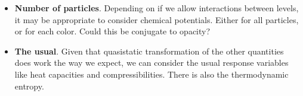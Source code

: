 \documentclass[../notebook.tex]{subfiles}
\begin{document}
\begin{itemize}
  \item \textbf{Number of particles}. Depending on if we allow interactions
    between levels, it may be appropriate to consider chemical potentials.
    Either for all particles, or for each color. Could this be conjugate to
    opacity?

  \item \textbf{The usual}. Given that quasistatic transformation of the other
    quantities does work the way we expect, we can consider the usual response
    variables like heat capacities and compressibilities. There is also the
    thermodynamic entropy.
\end{itemize}
\end{document}
